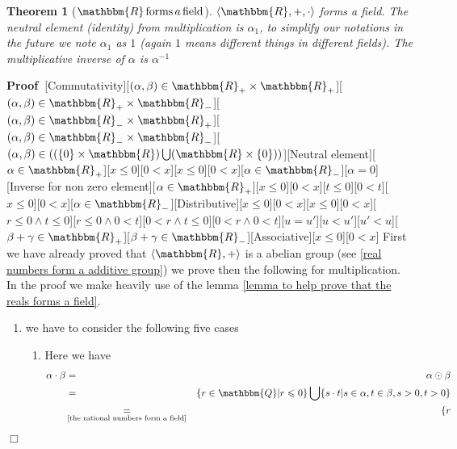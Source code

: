 \documentclass{book}
\newcommand{\equallim}{\mathop{=}\limits}
\newcommand{\nobracket}{}
\newcommand{\tmop}[1]{\ensuremath{\operatorname{#1}}}
\newcommand{\upl}{+}
\newenvironment{proof}{\noindent\textbf{Proof\ }}{\hspace*{\fill}$\Box$\medskip}
\newtheorem{theorem}{Theorem}
\begin{document}
{{\begin{theorem}[$\mathbbm{R} \tmop{forms} a \tmop{field}$]
  \label{the real numbers forms a field}{\index{$\langle \mathbbm{R}, +, \cdot
  \rangle \tmop{is} a \tmop{field}$}}$\langle \mathbbm{R}, +, \cdot \rangle$
  forms a field. The neutral element (identity) from multiplication is
  $\alpha_1$, to simplify our notations in the future we note $\alpha_1$ as
  $1$ (again $1$ means different things in different fields). The
  multiplicative inverse of $\alpha$ is $\alpha^{- 1}$
\end{theorem}

\begin{proof}[Commutativity][$(\alpha, \beta) \in \mathbbm{R}_+ \times
\mathbbm{R}_+$][$(\alpha, \beta) \in \mathbbm{R}_+ \times
\mathbbm{R}_-$][$(\alpha, \beta) \in \mathbbm{R}_- \times
\mathbbm{R}_+$][$(\alpha, \beta) \in \mathbbm{R}_- \times
\mathbbm{R}_-$][$(\alpha, \beta) \in \left( (\{ 0 \} \times \mathbbm{R})
\bigcup (\mathbbm{R} \times \{ 0 \}) \right)$][Neutral element][$\alpha \in
\mathbbm{R}_+$][$x \leqslant 0$][$0 < x$][$x \leqslant 0$][$0 < x$][$\alpha
\in \mathbbm{R}_-$][$\alpha = 0$][Inverse for non zero element][$\alpha \in
\mathbbm{R}_+$][$x \leqslant 0$][$0 < x$][$t \leqslant 0$][$0 < t$][$x
\leqslant 0$][$0 < x$][$\alpha \in \mathbbm{R}_-$][Distributive][$x \leqslant
0$][$0 < x$][$x \leqslant 0$][$0 < x$][$r \leqslant 0 \wedge t \leqslant
0$][$r \leqslant 0 \wedge 0 < t$][$0 < r \wedge t \leqslant 0$][$0 < r \wedge
0 < t$][$u = u'$][$u < u'$][$u' < u$][$\beta \upl \gamma \in
\mathbbm{R}_+$][$\beta \upl \gamma \in \mathbbm{R}_-$][Associative][$x
\leqslant 0$][$0 < x$]
  First we have already proved that $\langle \mathbbm{R}, + \rangle$ is a
  abelian group (see \ref{real numbers form a additive group}) we prove then
  the following for multiplication. In the proof we make heavily use of the
  lemma \ref{lemma to help prove that the reals forms a field}.
  \begin{enumerate}
    \item we have to consider the following five cases
    \begin{enumerate}
      \item Here we have
      \begin{eqnarray*}
        \alpha \cdot \beta & = & \alpha \odot \beta\\
        & = & \{ r \in \mathbbm{Q} | r \leqslant 0 \nobracket \} \bigcup \{ s
        \cdot t | s \in \alpha, t \in \beta, s > 0, t > 0 \nobracket \}\\
        & \equallim_{\text{\ref{the rational numbers form a field}}} & \{ r

\end{eqnarray*}
\end{enumerate}
\end{enumerate}
\end{proof}}}
\end{document}
